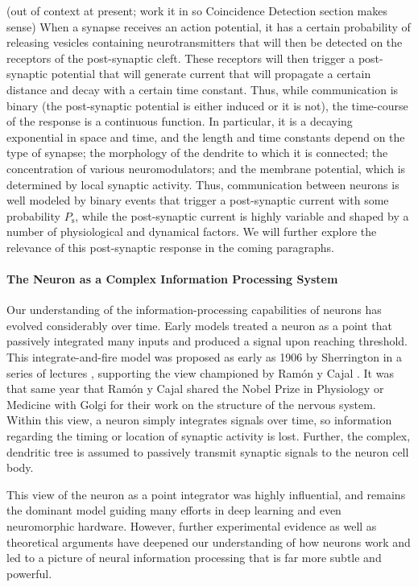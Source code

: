 \documentclass[twocolumn]{article}
\begin{document}
(out of context at present; work it in so Coincidence Detection section makes sense)
When a synapse receives an action potential, it has a certain probability of releasing vesicles containing neurotransmitters that will then be detected on the receptors of the post-synaptic cleft. These receptors will then trigger a post-synaptic potential that will generate current that will propagate a certain distance and decay with a certain time constant. Thus, while communication is binary (the post-synaptic potential is either induced or it is not), the time-course of the response is a continuous function. In particular, it is a decaying exponential in space and time, and the length and time constants depend on the type of synapse; the morphology of the dendrite to which it is connected; the concentration of various neuromodulators; and the membrane potential, which is determined by local synaptic activity. Thus, communication between neurons is well modeled by binary events that trigger a post-synaptic current with some probability $P_{\mathrm{s}}$, while the post-synaptic current is highly variable and shaped by a number of physiological and dynamical factors. We will further explore the relevance of this post-synaptic response in the coming paragraphs. 

\paragraph{The Neuron as a Complex Information Processing System}
Our understanding of the information-processing capabilities of neurons has evolved considerably over time. Early models treated a neuron as a point that passively integrated many inputs and produced a signal upon reaching threshold. This integrate-and-fire model was proposed as early as 1906 by Sherrington in a series of lectures \cite{sh1906}, supporting the view championed by Ram\'{o}n y Cajal \cite{ra1908}. It was that same year that Ram\'{o}n y Cajal shared the Nobel Prize in Physiology or Medicine with Golgi for their work on the structure of the nervous system. Within this view, a neuron simply integrates signals over time, so information regarding the timing or location of synaptic activity is lost. Further, the complex, dendritic tree is assumed to passively transmit synaptic signals to the neuron cell body. 

This view of the neuron as a point integrator was highly influential, and remains the dominant model guiding many efforts in deep learning and even neuromorphic hardware. However, further experimental evidence as well as theoretical arguments have deepened our understanding of how neurons work and led to a picture of neural information processing that is far more subtle and powerful. 
\end{document}

